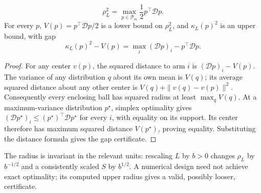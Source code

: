 \begin{lemma}
\begin{equation}
 \rho_L^2=\max_{p\in\mathscr P_m}\frac12p^\top\mathcal Dp.
 \label{eq:maxvariance}
\end{equation}
For every $p$, $V(p)=p^\top\mathcal Dp/2$ is a lower bound on $\rho_L^2$, and $\kappa_L(p)^2$ is an upper bound, with gap
\begin{equation}
 \kappa_L(p)^2-V(p)=\max_i(\mathcal Dp)_i-p^\top\mathcal Dp.
 \label{eq:designgap}
\end{equation}
\label{lem:designradius}
\end{lemma}
\begin{proof}
For any center $v(p)$, the squared distance to arm $i$ is
$(\mathcal Dp)_i-V(p)$. The variance of any distribution $q$ about its own mean is $V(q)$; its average squared distance about any other center is $V(q)+\|v(q)-v(p)\|^2$. Consequently every enclosing ball has squared radius at least $\max_qV(q)$. At a maximum-variance distribution $p^\star$, simplex optimality gives $(\mathcal Dp^\star)_i\le(p^\star)^\top\mathcal Dp^\star$ for every $i$, with equality on its support. Its center therefore has maximum squared distance $V(p^\star)$, proving equality. Substituting the distance formula gives the gap certificate.
\end{proof}
The radius is invariant in the relevant units: rescaling $L$ by $b>0$ changes $\rho_L$ by $b^{-1/2}$ and a consistently scaled $S$ by $b^{1/2}$. A numerical design need not achieve exact optimality; its computed upper radius gives a valid, possibly looser, certificate.

